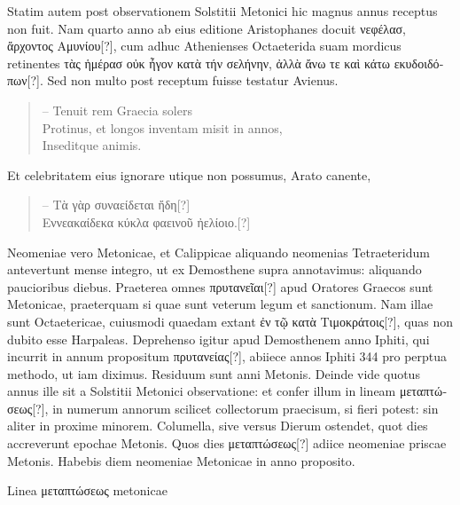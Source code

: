 Statim autem post observationem
Solstitii Metonici hic magnus annus receptus non fuit.
Nam quarto anno ab eius editione Aristophanes docuit
 \textgreek{νεφέλασ, ἄρχοντος
Αμυνίου[?]},
cum adhuc Athenienses Octaeterida suam mordicus
retinentes \textgreek{τὰς ἡμέρασ οὐκ ἦγον κατὰ τήν σελήνην,
 ἀλλὰ ἄνω τε καὶ κάτω εκυδοιδόπων[?]}.
Sed non multo post receptum fuisse testatur Avienus.
\begin{quote}
-- Tenuit rem Graecia solers\\
Protinus, et longos inventam misit in annos,\\
Inseditque animis.
\end{quote}
Et celebritatem eius ignorare utique non possumus, Arato canente,
\begin{quote}
-- \textgreek{Τὰ γὰρ συναείδεται ἤδη[?]}\\
\textgreek{Εννεακαίδεκα κύκλα φαεινοῦ ἠελίοιο.[?]}
\end{quote}
Neomeniae vero Metonicae, et Calippicae aliquando neomenias Tetraeteridum
antevertunt mense integro, ut ex Demosthene supra annotavimus:
aliquando paucioribus diebus.
Praeterea omnes \textgreek{πρυτανεῖαι[?]}
apud Oratores Graecos sunt Metonicae, praeterquam si quae sunt veterum
legum et sanctionum.
Nam illae sunt Octaetericae, cuiusmodi
quaedam extant \textgreek{ἐν τῷ κατὰ Τιμοκράτοις[?]},
 quas non dubito esse Harpaleas.
Deprehenso igitur apud Demosthenem anno Iphiti, qui incurrit in
annum propositum \textgreek{πρυτανείας[?]}, abiiece annos Iphiti 344 pro perptua
methodo, ut iam diximus.
Residuum sunt anni Metonis.
Deinde
vide quotus annus ille sit a Solstitii Metonici
observatione: et confer illum in lineam
\textgreek{μεταπτώσεως[?]}, in numerum annorum scilicet collectorum
praecisum, si fieri potest: sin aliter in proxime
minorem.
Columella, sive versus Dierum
ostendet, quot dies accreverunt epochae Metonis.
Quos dies \textgreek{μεταπτώσεως[?]} adiice neomeniae priscae
Metonis.
Habebis diem neomeniae Metonicae
in anno proposito.
\begin{table}[htb]
 \centering
 \small
 \renewcommand{\arraystretch}{1.1}
 
 \caption{Linea \textgreek{μεταπτώσεως} metonicae}
 \label{tab:linea_metaptoseos_metonicae}
\end{table}
